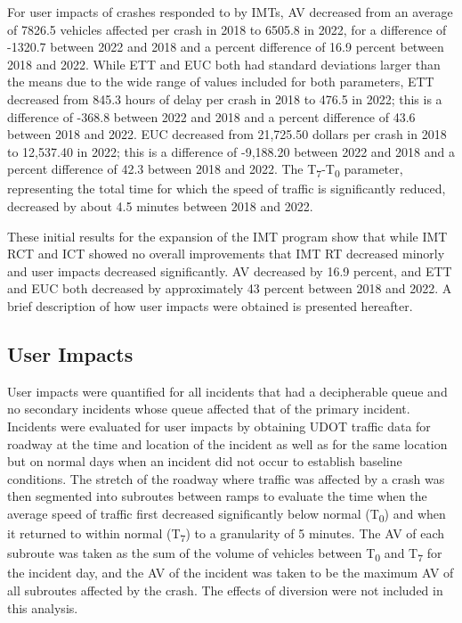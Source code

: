 \documentclass[
  letterpaper,
  authoryear]{elsarticle}
\begin{document}
For user impacts of crashes responded to by IMTs, AV decreased from an
average of 7826.5 vehicles affected per crash in 2018 to 6505.8 in 2022,
for a difference of -1320.7 between 2022 and 2018 and a percent
difference of 16.9 percent between 2018 and 2022. While ETT and EUC both
had standard deviations larger than the means due to the wide range of
values included for both parameters, ETT decreased from 845.3 hours of
delay per crash in 2018 to 476.5 in 2022; this is a difference of -368.8
between 2022 and 2018 and a percent difference of 43.6 between 2018 and
2022. EUC decreased from 21,725.50 dollars per crash in 2018 to
12,537.40 in 2022; this is a difference of -9,188.20 between 2022 and
2018 and a percent difference of 42.3 between 2018 and 2022. The
T\textsubscript{7}-T\textsubscript{0} parameter, representing the total
time for which the speed of traffic is significantly reduced, decreased
by about 4.5 minutes between 2018 and 2022.

These initial results for the expansion of the IMT program show that
while IMT RCT and ICT showed no overall improvements that IMT RT
decreased minorly and user impacts decreased significantly. AV decreased
by 16.9 percent, and ETT and EUC both decreased by approximately 43
percent between 2018 and 2022. A brief description of how user impacts
were obtained is presented hereafter.

\subsection{User Impacts}\label{user-impacts}

User impacts were quantified for all incidents that had a decipherable
queue and no secondary incidents whose queue affected that of the
primary incident. Incidents were evaluated for user impacts by obtaining
UDOT traffic data for roadway at the time and location of the incident
as well as for the same location but on normal days when an incident did
not occur to establish baseline conditions. The stretch of the roadway
where traffic was affected by a crash was then segmented into subroutes
between ramps to evaluate the time when the average speed of traffic
first decreased significantly below normal (T\textsubscript{0}) and when
it returned to within normal (T\textsubscript{7}) to a granularity of 5
minutes. The AV of each subroute was taken as the sum of the volume of
vehicles between T\textsubscript{0} and T\textsubscript{7} for the
incident day, and the AV of the incident was taken to be the maximum AV
of all subroutes affected by the crash. The effects of diversion were
not included in this analysis.
\end{document}
